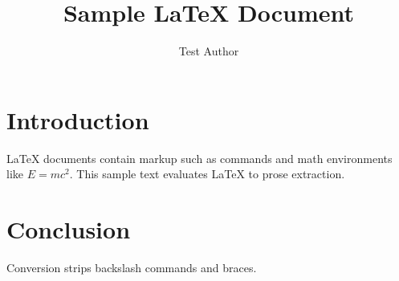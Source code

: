 \documentclass{article}
\begin{document}
\title{Sample LaTeX Document}
\author{Test Author}
\maketitle

\section{Introduction}
LaTeX documents contain markup such as commands and math environments like $E = mc^2$.
This sample text evaluates LaTeX to prose extraction.

\section{Conclusion}
Conversion strips backslash commands and braces.
\end{document}
